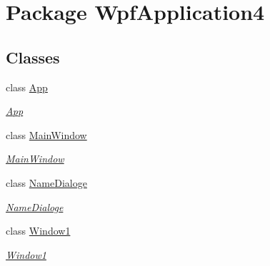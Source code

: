 \hypertarget{namespace_wpf_application4}{\section{Package Wpf\-Application4}
\label{namespace_wpf_application4}
}
\subsection*{Classes}
\begin{DoxyCompactItemize}
\item 
class \hyperlink{class_wpf_application4_1_1_app}{App}
\begin{DoxyCompactList}\small\item\em \hyperlink{class_wpf_application4_1_1_app}{App} \end{DoxyCompactList}\item 
class \hyperlink{class_wpf_application4_1_1_main_window}{Main\-Window}
\begin{DoxyCompactList}\small\item\em \hyperlink{class_wpf_application4_1_1_main_window}{Main\-Window} \end{DoxyCompactList}\item 
class \hyperlink{class_wpf_application4_1_1_name_dialoge}{Name\-Dialoge}
\begin{DoxyCompactList}\small\item\em \hyperlink{class_wpf_application4_1_1_name_dialoge}{Name\-Dialoge} \end{DoxyCompactList}\item 
class \hyperlink{class_wpf_application4_1_1_window1}{Window1}
\begin{DoxyCompactList}\small\item\em \hyperlink{class_wpf_application4_1_1_window1}{Window1} \end{DoxyCompactList}\end{DoxyCompactItemize}
